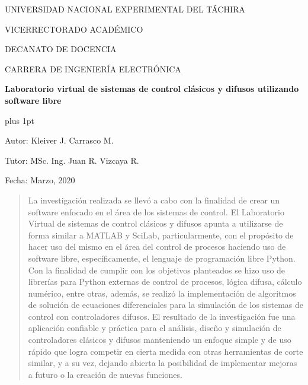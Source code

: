 \begin{center}
	\begin{spacing}{1}
		UNIVERSIDAD NACIONAL EXPERIMENTAL DEL TÁCHIRA
		
		VICERRECTORADO ACADÉMICO
		
		DECANATO DE DOCENCIA
		
		CARRERA DE INGENIERÍA ELECTRÓNICA
	
		\vspace{35pt}

		{\large \textbf{Laboratorio virtual de sistemas de control clásicos y difusos utilizando software libre}\par}
	
	\end{spacing}
\end{center}

\vspace{25pt}

\begin{flushright}
	\begin{spacing}{1}
		\parskip=0pt plus 1pt

		Autor: Kleiver J. Carrasco M.

		Tutor: MSc. Ing. Juan R. Vizcaya R.

		Fecha: Marzo, 2020
		
	\end{spacing}	
\end{flushright}

\vspace{15pt}

\begin{abstract}
	La investigación realizada se llevó a cabo con la finalidad de crear un software enfocado en el área de los sistemas de control. El Laboratorio Virtual de sistemas de control clásicos y difusos apunta a utilizarse de forma similar a MATLAB y SciLab, particularmente, con el propósito de hacer uso del mismo en el área del control de procesos haciendo uso de software libre, específicamente, el lenguaje de programación libre Python. Con la finalidad de cumplir con los objetivos planteados se hizo uso de librerías para Python externas de control de procesos, lógica difusa, cálculo numérico, entre otras, además, se realizó la implementación de algoritmos de solución de ecuaciones diferenciales para la simulación de los sistemas de control con controladores difusos. El resultado de la investigación fue una aplicación confiable y práctica para el análisis, diseño y simulación de controladores clásicos y difusos manteniendo un enfoque simple y de uso rápido que logra competir en cierta medida con otras herramientas de corte similar, y a su vez, dejando abierta la posibilidad de implementar mejoras a futuro o la creación de nuevas funciones.
\end{abstract}

